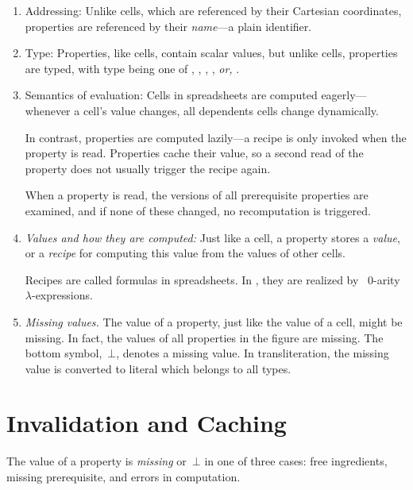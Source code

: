 \begin{enumerate}
  \item{Addressing:} Unlike cells, which are referenced by their Cartesian coordinates,
  properties are referenced by their \emph{name}---a plain identifier.

  \item{Type:} Properties, like cells, contain scalar values, but unlike cells,
  properties are typed, with type being one of , ,
  , , \emph{or,} .

  \item{Semantics of evaluation:} Cells in spreadsheets are computed
  eagerly---whenever a cell's value changes, all dependents cells change
  dynamically.

  In contrast, properties are computed lazily---a recipe is only invoked
  when the property is read. Properties cache their value, so a second read
  of the property does not usually trigger the recipe again.

  When a property is read, the versions of all prerequisite properties are
  examined, and if none of these changed, no recomputation is
  triggered.

  \item\emph{Values and how they are computed:} Just like a cell, a property
    stores a \emph{value}, or a \emph{recipe} for computing this value from the
    values of other cells.

  Recipes are called formulas in spreadsheets. In \Reap, they are realized
  by \Java~$0$-arity~$λ$-expressions.

  \item\emph{Missing values.} The value of a property, just like the value
  of a cell, might be missing. In fact, the values of all properties in the
  figure are missing. The bottom symbol,~$⊥$, denotes a missing value. In
  transliteration, the missing value is converted to literal  which
  belongs to all types.

\end{enumerate}

\section{Invalidation and Caching}

The value of a property is \emph{missing} or~$⊥$ in one of three cases: free
ingredients, missing prerequisite, and errors in computation.

